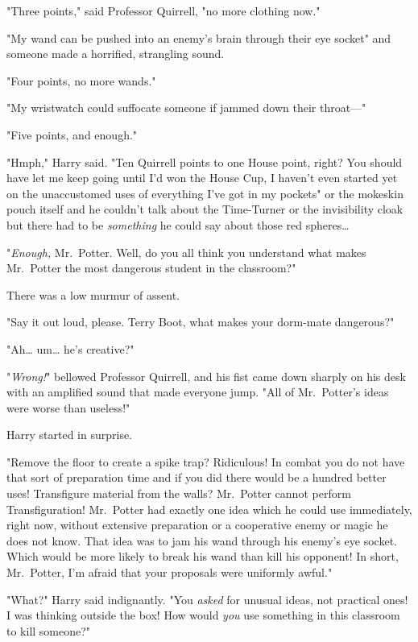 "Three points," said Professor Quirrell, "no more clothing now."

"My wand can be pushed into an enemy's brain through their eye socket" and 
someone made a horrified, strangling sound.

"Four points, no more wands."

"My wristwatch could suffocate someone if jammed down their throat---"

"Five points, and enough."

"Hmph," Harry said. "Ten Quirrell points to one House point, right? You should 
have let me keep going until I'd won the House Cup, I haven't even started yet 
on the unaccustomed uses of everything I've got in my pockets" or the mokeskin 
pouch itself and he couldn't talk about the Time-Turner or the invisibility 
cloak but there had to be \emph{something} he could say about those red 
spheres{\ldots}

"\emph{Enough,} Mr.~Potter. Well, do you all think you understand what makes 
Mr.~Potter the most dangerous student in the classroom?"

There was a low murmur of assent.

"Say it out loud, please. Terry Boot, what makes your dorm-mate dangerous?"

"Ah{\ldots} um{\ldots} he's creative?"

"\emph{Wrong!}" bellowed Professor Quirrell, and his fist came down sharply on 
his desk with an amplified sound that made everyone jump. "All of Mr.~Potter's 
ideas were worse than useless!"

Harry started in surprise.

"Remove the floor to create a spike trap? Ridiculous! In combat you do not have 
that sort of preparation time and if you did there would be a hundred better 
uses! Transfigure material from the walls? Mr.~Potter cannot perform 
Transfiguration! Mr.~Potter had exactly one idea which he could use 
immediately, right now, without extensive preparation or a cooperative enemy or 
magic he does not know. That idea was to jam his wand through his enemy's eye 
socket. Which would be more likely to break his wand than kill his opponent! In 
short, Mr.~Potter, I'm afraid that your proposals were uniformly awful."

"What?" Harry said indignantly. "You \emph{asked} for unusual ideas, not 
practical ones! I was thinking outside the box! How would \emph{you} use 
something in this classroom to kill someone?"

